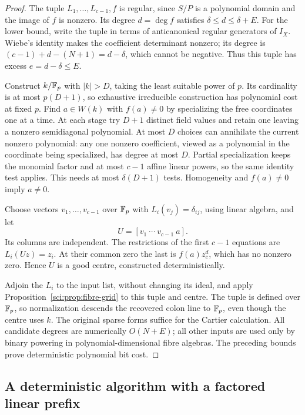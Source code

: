 \begin{proof}
The tuple \(L_1,\ldots,L_{c-1},f\) is regular, since \(S/P\)
is a polynomial domain and the image of \(f\) is nonzero. Its degree
\(d=\deg f\) satisfies \(\delta\leq d\leq\delta+E\).
For the lower bound, write the tuple in terms of anticanonical regular
generators of \(I_X\). Wiebe's identity makes the coefficient
determinant nonzero; its degree is \((c-1)+d-(N+1)=d-\delta\),
which cannot be negative. Thus this tuple has excess
\(e=d-\delta\leq E\).

Construct \(k/\mathbb F_p\) with \(|k|>D\), taking the least suitable
power of \(p\). Its cardinality is at most \(p(D+1)\), so exhaustive
irreducible construction has polynomial cost at fixed \(p\).
Find \(a\in W(k)\) with \(f(a)\ne0\) by specializing the free
coordinates one at a time. At each stage try \(D+1\) distinct field
values and retain one leaving a nonzero semidiagonal polynomial.
At most \(D\) choices can annihilate the current nonzero polynomial:
any one nonzero coefficient, viewed as a polynomial in the coordinate
being specialized, has degree at most \(D\). Partial specialization
keeps the monomial factor and at most \(c-1\) affine linear powers,
so the same identity test applies. This needs at most
\(\delta(D+1)\) tests. Homogeneity and \(f(a)\ne0\) imply \(a\ne0\).

Choose vectors \(v_1,\ldots,v_{c-1}\) over \(\mathbb F_p\) with
\(L_i(v_j)=\delta_{ij}\), using linear algebra, and let
\[
 U=[v_1\ \cdots\ v_{c-1}\ a].
\]
Its columns are independent. The restrictions of the first \(c-1\)
equations are \(L_i(Uz)=z_i\). At their common zero the last is
\(f(a)z_c^d\), which has no nonzero zero. Hence \(U\) is a good
centre, constructed deterministically.

Adjoin the \(L_i\) to the input list, without changing its ideal,
and apply Proposition~\ref{sci:prop:fibre-grid} to this tuple and
centre. The tuple is defined over \(\mathbb F_p\), so normalization descends
the recovered colon line to \(\mathbb F_p\), even though the centre uses
\(k\). The original sparse forms suffice for the Cartier calculation.
All candidate degrees are numerically \(O(N+E)\); all other inputs
are used only by binary powering in polynomial-dimensional fibre
algebras. The preceding bounds prove deterministic polynomial bit cost.
\end{proof}

\subsection{A deterministic algorithm with a factored linear prefix}

